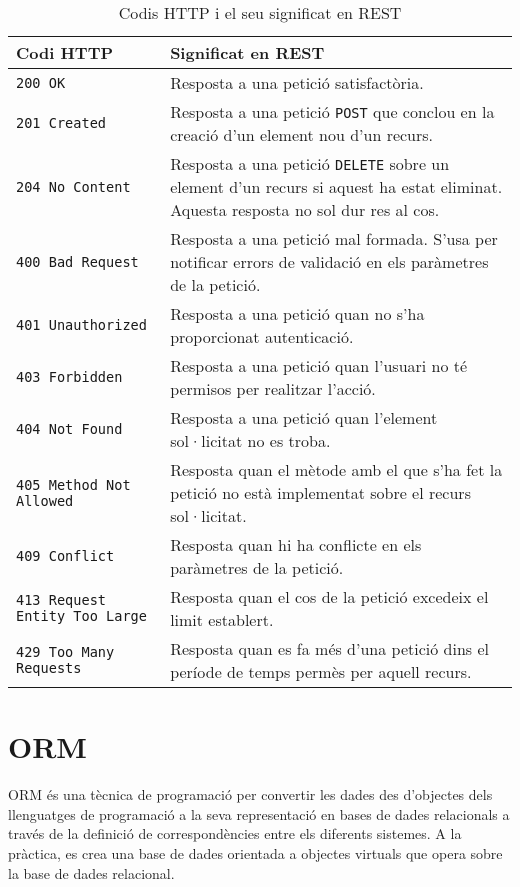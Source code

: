 \begin{table}[h!]
 	\begin{center}
 		\begin{tabularx}{\textwidth}{|l|X|}
  			\hline
 			\bfseries Codi \ac{HTTP} & \bfseries Significat en \ac{REST} \\ \hline
			\texttt{200 OK} & Resposta a una petició satisfactòria.\\ \hline 
			\texttt{201 Created} & Resposta a una petició \texttt{POST} que conclou en la creació d'un element nou d'un recurs.\\ \hline
			\texttt{204 No Content} & Resposta a una petició \texttt{DELETE} sobre un element d'un recurs si aquest ha estat eliminat. Aquesta resposta no sol dur res al cos.\\ \hline
			\texttt{400 Bad Request} & Resposta a una petició mal formada. S'usa per notificar errors de validació en els paràmetres de la petició.\\ \hline
			\texttt{401 Unauthorized} & Resposta a una petició quan no s'ha proporcionat autenticació. \\ \hline
			\texttt{403 Forbidden} & Resposta a una petició quan l'usuari no té permisos per realitzar l'acció.\\ \hline
			\texttt{404 Not Found} & Resposta a una petició quan l'element sol·licitat no es troba. \\ \hline
			\texttt{405 Method Not Allowed} & Resposta quan el mètode amb el que s'ha fet la petició no està implementat sobre el recurs sol·licitat.\\ \hline
			
			\texttt{409 Conflict} & Resposta quan hi ha conflicte en els paràmetres de la petició.\\ \hline
			\texttt{413 Request Entity Too Large} & Resposta quan el cos de la petició excedeix el limit establert. \\ \hline
			\texttt{429 Too Many Requests} & Resposta quan es fa més d'una petició dins el període de temps permès per aquell recurs. \\ \hline
		\end{tabularx}
	\end{center}
	\caption{Codis \ac{HTTP} i el seu significat en \ac{REST}} 
	\label{table:codis_http}
\end{table}
\section{\ac{ORM}}
\ac{ORM} és una tècnica de programació per convertir les dades des d'objectes dels llenguatges de programació a la seva representació en bases de dades relacionals a través de la definició de correspondències entre els diferents sistemes. A la pràctica, es crea una base de dades orientada a objectes virtuals que opera sobre la base de dades relacional.\\

